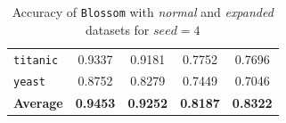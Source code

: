 \documentclass[12pt]{report}
\theoremstyle{definition}
\theoremstyle{definition}
\theoremstyle{definition}
\begin{document}
\begin{table}[ht]
\begin{tabular}{lcccc}
    \multicolumn{1}{l}{\tt titanic}       & \multicolumn{1}{c}{0.9337} & \multicolumn{1}{c}{0.9181} & \multicolumn{1}{c}{0.7752} & \multicolumn{1}{c}{0.7696} \\
    \multicolumn{1}{l}{\tt yeast}         & \multicolumn{1}{c}{0.8752} & \multicolumn{1}{c}{0.8279} & \multicolumn{1}{c}{0.7449} & \multicolumn{1}{c}{0.7046} \\
    \hline
    \multicolumn{1}{l}{\bf Average}       & \multicolumn{1}{c}{\bf 0.9453} & \multicolumn{1}{c}{\bf 0.9252} & \multicolumn{1}{c}{\bf 0.8187} & \multicolumn{1}{c}{\bf 0.8322} \\
    \hline
    \end{tabular}
    \caption{Accuracy of \texttt{Blossom} with \textit{normal} and \textit{expanded} datasets for $seed=4$}
    \label{fig:seed4}
\end{table}
\end{document}
